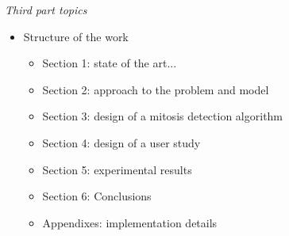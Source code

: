 \vspace{0.5cm}






\emph{Third part topics}

\begin{itemize}
\item Structure of the work
	\begin{itemize}
	\item Section 1: state of the art...
	\item Section 2: approach to the problem and model
	\item Section 3: design of a mitosis detection algorithm
	\item Section 4: design of a user study
	\item Section 5: experimental results
	\item Section 6: Conclusions
	\item Appendixes: implementation details
	\end{itemize}
\end{itemize}

